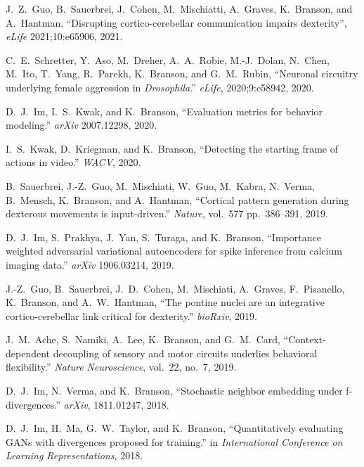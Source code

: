 \begin{cvenum}
\item J.~Z.~Guo, B.~Sauerbrei, J.~Cohen, M.~Mischiatti, A.~Graves, K.~Branson, and A.~Hantman. ``Disrupting cortico-cerebellar communication impairs dexterity'', {\em eLife} 2021;10:e65906, 2021.
  
\item C.~E.~Schretter, Y.~Aso, M.~Dreher, A.~A.~Robie, M.-J.~Dolan, N.~Chen, M.~Ito, T.~Yang, R.~Parekh, K.~Branson, and G.~M.~Rubin, ``Neuronal circuitry underlying female aggression in {\em {{D}}rosophila}.'' {\em eLife}, 2020;9:e58942, 2020.
  
\item D.~J.~Im, I.~S.~Kwak, and K.~Branson, ``Evaluation metrics for behavior modeling.'' {\em arXiv} 2007.12298, 2020.
  
\item I.~S.~Kwak, D.~Kriegman, and K.~Branson, ``Detecting the starting frame of actions in video.'' {\em WACV}, 2020.

\item B.~Sauerbrei, J.-Z.~Guo, M.~Mischiati, W.~Guo, M.~Kabra, N.~Verma, B.~Mensch, K.~Branson, and A.~Hantman, ``Cortical pattern generation during dexterous movements is input-driven.'' {\em Nature}, vol.~577 pp.~386--391, 2019.

\item D.~J.~Im, S.~Prakhya, J.~Yan, S.~Turaga, and K.~Branson, ``Importance weighted
  adversarial variational autoencoders for spike inference from calcium imaging
  data.'' {\em arXiv} 1906.03214, 2019.

\item J.-Z.~Guo, B.~Sauerbrei, J.~D.~Cohen, M.~Mischiati, A.~Graves, F.~Pisanello,
  K.~Branson, and A.~W.~Hantman, ``The pontine nuclei are an integrative
  cortico-cerebellar link critical for dexterity.'' {\em bioRxiv}, 2019.

\item J.~M.~Ache, S.~Namiki, A.~Lee, K.~Branson, and G.~M.~Card, ``Context-dependent
  decoupling of sensory and motor circuits underlies behavioral flexibility.''
  {\em Nature Neuroscience}, vol.~22, no.~7, 2019.

\item D.~J.~Im, N.~Verma, and K.~Branson, ``Stochastic neighbor embedding under
  f-divergences.'' {\em arXiv}, 1811.01247, 2018.

\item D.~J.~Im, H.~Ma, G.~W.~Taylor, and K.~Branson,
  ``Quantitatively evaluating {GAN}s with divergences proposed for training.''
  in {\em International Conference on Learning Representations},
  2018.


\end{cvenum}
